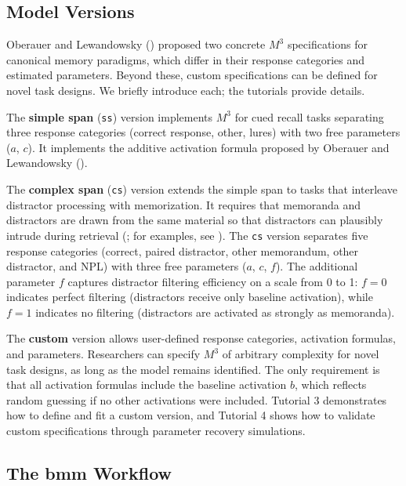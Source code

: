 \documentclass[
  man,
  floatsintext,
  longtable,
  nolmodern,
  notxfonts,
  notimes,
  colorlinks=true,linkcolor=blue,citecolor=blue,urlcolor=blue]{apa7}
\begin{document}
\subsection{Model Versions}\label{model-versions}

Oberauer and Lewandowsky ()
proposed two concrete \(M^3\) specifications for canonical memory
paradigms, which differ in their response categories and estimated
parameters. Beyond these, custom specifications can be defined for novel
task designs. We briefly introduce each; the tutorials provide details.

The \textbf{simple span} (\texttt{ss}) version implements \(M^3\) for
cued recall tasks separating three response categories (correct
response, other, lures) with two free parameters (\(a\), \(c\)). It
implements the additive activation formula proposed by Oberauer and
Lewandowsky ().

The \textbf{complex span} (\texttt{cs}) version extends the simple span
to tasks that interleave distractor processing with memorization. It
requires that memoranda and distractors are drawn from the same material
so that distractors can plausibly intrude during retrieval
(; for examples, see
). The
\texttt{cs} version separates five response categories (correct, paired
distractor, other memorandum, other distractor, and NPL) with three free
parameters (\(a\), \(c\), \(f\)). The additional parameter \(f\)
captures distractor filtering efficiency on a scale from 0 to 1:
\(f = 0\) indicates perfect filtering (distractors receive only baseline
activation), while \(f = 1\) indicates no filtering (distractors are
activated as strongly as memoranda).

The \textbf{custom} version allows user-defined response categories,
activation formulas, and parameters. Researchers can specify \(M^3\) of
arbitrary complexity for novel task designs, as long as the model
remains identified. The only requirement is that all activation formulas
include the baseline activation \(b\), which reflects random guessing if
no other activations were included. Tutorial 3 demonstrates how to
define and fit a custom version, and Tutorial 4 shows how to validate
custom specifications through parameter recovery simulations.

\subsection{The bmm Workflow}\label{the-bmm-workflow}
\end{document}
